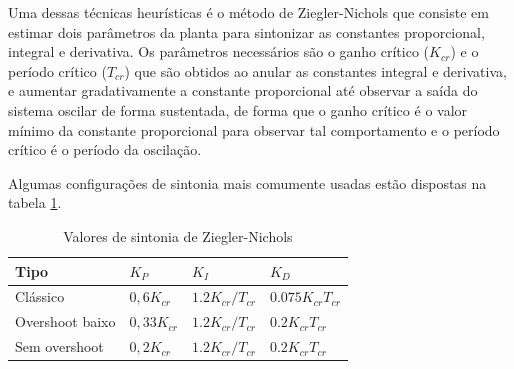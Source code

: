 Uma dessas técnicas heurísticas é o método de Ziegler-Nichols que consiste em estimar dois parâmetros da planta para sintonizar as constantes proporcional, integral e derivativa. Os parâmetros necessários são o ganho crítico ($K_{cr}$) e o período crítico ($T_{cr}$) que são obtidos ao anular as constantes integral e derivativa, e aumentar gradativamente a constante proporcional até observar a saída do sistema oscilar de forma sustentada, de forma que o ganho crítico é o valor mínimo da constante proporcional para observar tal comportamento e o período crítico é o período da oscilação.

Algumas configurações de sintonia mais comumente usadas estão dispostas na tabela \ref{ZN}.

\begin{table}[htb]
    \centering
    \caption{Valores de sintonia de Ziegler-Nichols}
    \label{ZN}
    \begin{tabular}{llll}
    \hline
    Tipo            & $K_P$        & $K_I$            & $K_D$            \\ 
    \hline \hline
    Clássico        & $0,6K_{cr}$  & $1.2K_{cr}/T_{cr}$ & $0.075K_{cr}T_{cr}$ \\ 
    \hline
    Overshoot baixo & $0,33K_{cr}$ & $1.2K_{cr}/T_{cr}$ & $0.2K_{cr}T_{cr}$ \\ 
    \hline
    Sem overshoot   & $0,2K_{cr}$  & $1.2K_{cr}/T_{cr}$ & $0.2K_{cr}T_{cr}$ \\
    \hline
    \end{tabular}
\end{table}

